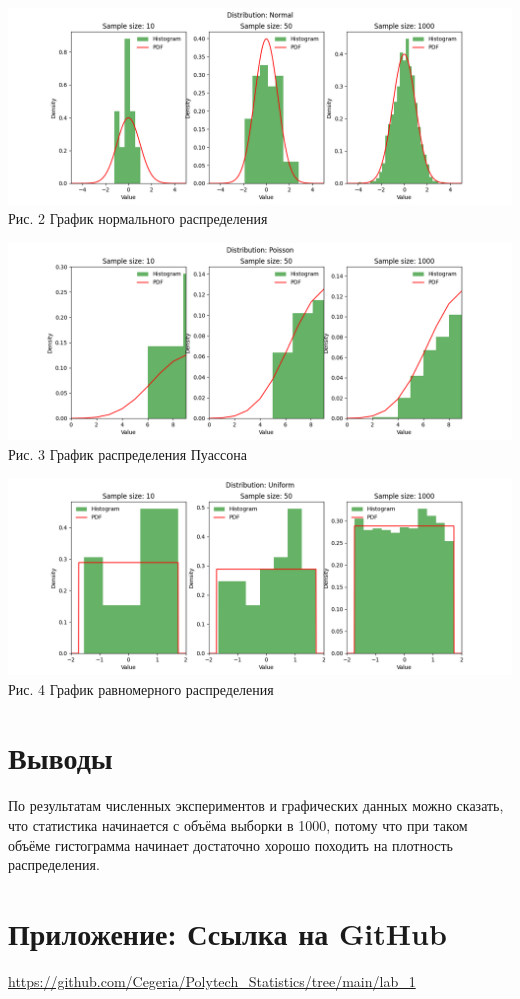 \documentclass[12pt]{article}
\begin{document}
\begin{center}
    \includegraphics[scale=0.65]{lab_1_Normal.png} \\
    Рис. 2 График нормального распределения
\end{center}

\begin{center}
    \includegraphics[scale=0.65]{lab_1_Poisson.png} \\
    Рис. 3 График распределения Пуассона
\end{center}

\begin{center}
    \includegraphics[scale=0.65]{lab_1_Uniform.png} \\
    Рис. 4 График равномерного распределения
\end{center}

\section{Выводы}
По результатам численных экспериментов и графических данных можно сказать, что статистика начинается с объёма выборки в 1000, потому что при таком объёме гистограмма начинает достаточно хорошо походить на плотность распределения.
\section*{Приложение: Ссылка на GitHub}
\url{https://github.com/Cegeria/Polytech_Statistics/tree/main/lab_1}
\end{document}
